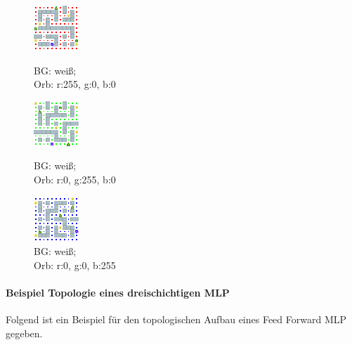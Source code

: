 \begin{figure}[htb!]
   \captionsetup{width=0.3\linewidth} 
    \begin{minipage}{0.3\linewidth}
        \centering
        \includegraphics[scale=1.2]{abb/_envpics/example_whiteBG_red}
        \caption*{BG: weiß; \\ Orb: r:255, g:0, b:0}
        \label{fig:pic_chaser_whiteBG_red}
    \end{minipage}
    \begin{minipage}{0.3\linewidth}
        \centering
        \includegraphics[scale=1.2]{abb/_envpics/example_whiteBG_green}
        \caption*{BG: weiß; \\ Orb: r:0, g:255, b:0}
        \label{fig:pic_chaser_whiteBG_green}
    \end{minipage}
    \begin{minipage}{0.3\linewidth}
        \centering
        \includegraphics[scale=1.2]{abb/_envpics/example_whiteBG_blue}
        \caption*{BG: weiß; \\ Orb: r:0, g:0, b:255}
        \label{fig:pic_chaser_whiteBG_blue}
    \end{minipage}
\end{figure}


\paragraph{Beispiel Topologie eines dreischichtigen MLP}
\label{anh_mlp_L3}
Folgend ist ein Beispiel für den topologischen Aufbau eines Feed Forward MLP gegeben. 

